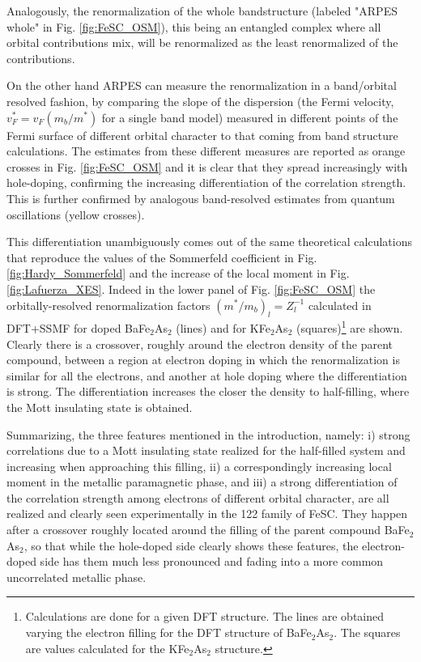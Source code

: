 \documentclass[12pt,twoside]{article}
\begin{document}
Analogously, the renormalization of the whole bandstructure (labeled "ARPES whole" in Fig. \ref{fig:FeSC_OSM}), this being an entangled complex where all orbital contributions mix, will be renormalized as the least renormalized of the contributions.

On the other hand ARPES can measure the renormalization in a band/orbital resolved fashion, by comparing the slope of the dispersion (the Fermi velocity, $v_F^*=v_F(m_b/m^*)$ for a single band model) measured in different points of the Fermi surface of different orbital character to that coming from band structure calculations. The estimates from these different measures are reported as orange crosses in Fig. \ref{fig:FeSC_OSM} and it is clear that they spread increasingly with hole-doping, confirming the increasing differentiation of the correlation strength. This is further confirmed by analogous band-resolved estimates from quantum oscillations (yellow crosses).

This differentiation unambiguously comes out of the same theoretical calculations that reproduce the values of the Sommerfeld coefficient in Fig. \ref{fig:Hardy_Sommerfeld} and the increase of the local moment in Fig. \ref{fig:Lafuerza_XES}. Indeed in the lower panel of Fig. \ref{fig:FeSC_OSM} the orbitally-resolved renormalization factors $(m^*/m_b)_l=Z_l^{-1}$ calculated in DFT+SSMF for doped BaFe$_2$As$_2$ (lines) and for KFe$_2$As$_2$ (squares)\footnote{Calculations are done for a given DFT structure. The lines are obtained varying the electron filling for the DFT structure of BaFe$_2$As$_2$. The squares are values calculated for the KFe$_2$As$_2$ structure.} are shown. Clearly there is a crossover, roughly around the electron density of the parent compound, between a region at electron doping in which the renormalization is similar for all the electrons, and another at hole doping where the differentiation is strong. The differentiation increases the closer the density to half-filling, where the Mott insulating state is obtained.

Summarizing, the three features mentioned in the introduction, namely: i) strong correlations due to a Mott insulating state realized for the half-filled system and increasing when approaching this filling, ii) a correspondingly increasing local moment in the metallic paramagnetic phase, and iii) a strong differentiation of the correlation strength among electrons of different orbital character, are all realized and clearly seen experimentally in the 122 family of FeSC. They happen after a crossover roughly located around the filling of the parent compound BaFe$_2$As$_2$, so that while the hole-doped side clearly shows these features, the electron-doped side has them much less pronounced and fading into a more common uncorrelated metallic phase. 
\end{document}
